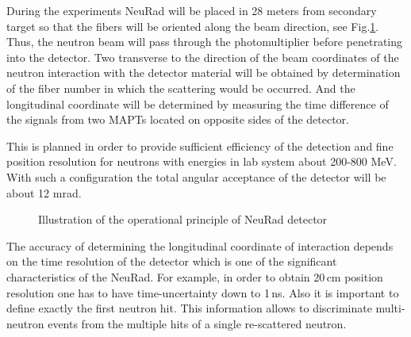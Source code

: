 \documentclass{webofc}
\begin{document}
During the experiments NeuRad will be placed in 28 meters from secondary target so that the fibers will be oriented along the beam direction, see Fig.\ref{ris:neuradPrinciple}.
Thus, the neutron beam will pass through the photomultiplier before penetrating into the detector.
Two transverse to the direction of the beam coordinates of the neutron interaction with the detector material will be obtained by determination of the fiber number in which the scattering would be occurred.
And the longitudinal coordinate will be determined by measuring the time difference of the signals from two MAPTs located on opposite sides of the detector.

This is planned in order to provide sufficient efficiency of the detection and fine position resolution for neutrons with energies in lab system about 200-800 MeV.
With such a configuration the total angular acceptance of the detector will be about 12 mrad.
\begin{figure}[h]
	\caption{Illustration of the operational principle of NeuRad detector}
	\label{ris:neuradPrinciple}
\end{figure}

The accuracy of determining the longitudinal coordinate of interaction depends on the time resolution of the detector which is one of the significant characteristics of the NeuRad. %
For example, in order to obtain 20\,cm position resolution one has to have time-uncertainty down to 1\,ns. Also it is important to define exactly the first neutron hit. This information allows to discriminate multi-neutron events from the multiple hits of a single re-scattered neutron.
\end{document}
